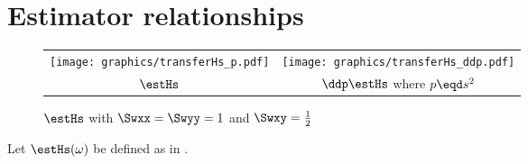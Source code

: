 \section{Estimator relationships}
\begin{figure}[h]
  \begin{tabular}{|c|c|}
    \hline
     \texttt{[image: graphics/transferHs\_p.pdf]}
    &\texttt{[image: graphics/transferHs\_ddp.pdf]}
    \\
    $\estHs$&$\ddp\estHs$ where $p\eqd s^2$
    \\\hline
  \end{tabular}
  \caption{$\estHs$ with $\Swxx=\Swyy=1$ and $\Swxy=\frac{1}{2}$\label{fig:Hs}}
\end{figure}
\begin{proposition}              %
\label{prop:Hs_lim}              %
Let $\estHs(\omega)$ be defined as in .
\end{proposition}

